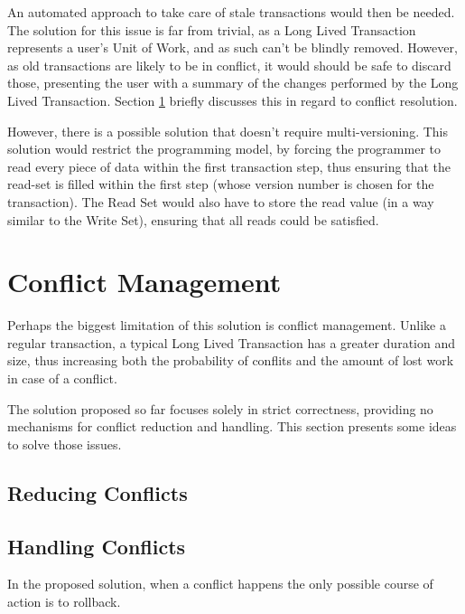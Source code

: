 An automated approach to take care of stale transactions would then be
needed. The solution for this issue is far from trivial, as a Long
Lived Transaction represents a user's Unit of Work, and as such can't
be blindly removed. However, as old transactions are likely to be in
conflict, it would should be safe to discard those, presenting the
user with a summary of the changes performed by the Long Lived
Transaction. Section \ref{sec:conflicts} briefly discusses this in
regard to conflict resolution.

However, there is a possible solution that doesn't require
multi-versioning. This solution would restrict the programming model,
by forcing the programmer to read every piece of data within the first
transaction step, thus ensuring that the read-set is filled within the
first step (whose version number is chosen for the transaction). The
Read Set would also have to store the read value (in a way similar to
the Write Set), ensuring that all reads could be satisfied.

\section{Conflict Management}
\label{sec:conflicts}

Perhaps the biggest limitation of this solution is conflict
management. Unlike a regular transaction, a typical Long Lived
Transaction has a greater duration and size, thus increasing both the
probability of conflits and the amount of lost work in case of a
conflict.

The solution proposed so far focuses solely in strict correctness,
providing no mechanisms for conflict reduction and handling. This
section presents some ideas to solve those issues.

\subsection{Reducing Conflicts}



\subsection{Handling Conflicts}

In the proposed solution, when a conflict happens the only possible
course of action is to rollback. 